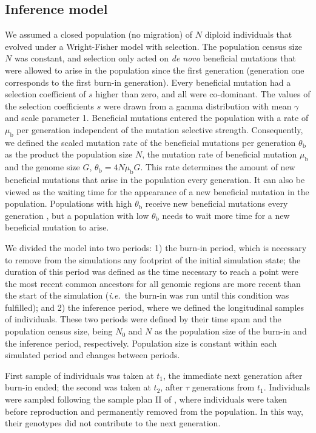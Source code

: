 \documentclass[a4paper, 12pt]{article}
\begin{document}
\subsection*{Inference model}

We assumed a closed population (no migration) of $N$ diploid individuals that evolved under a Wright-Fisher model with selection. The population census size $N$ was constant, and selection only acted on \textit{de novo} beneficial mutations that were allowed to arise in the population since the first generation (generation one corresponds to the first burn-in generation). Every beneficial mutation had a selection coefficient of $s$ higher than zero, and all were co-dominant. The values of the selection coefficients $s$ were drawn from a gamma distribution with mean $\gamma$ and scale parameter 1. Beneficial mutations entered the population with a rate of $\mu_\mathrm{b}$ per generation independent of the mutation selective strength. Consequently, we defined the scaled mutation rate of the beneficial mutations per generation $\theta_\mathrm{b}$ as the product the population size $N$, the mutation rate of beneficial mutation $\mu_\mathrm{b}$ and the genome size $G$, $\theta_\mathrm{b} = 4N\mu_\mathrm{b}G$. This rate determines the amount of new beneficial mutations that arise in the population every generation. It can also be viewed as the waiting time for the appearance of a new beneficial mutation in the population. Populations with high $\theta_\mathrm{b}$ receive new beneficial mutations every generation \citep{Karasov:2010di}, but a population with low $\theta_\mathrm{b}$ needs to wait more time for a new beneficial mutation to arise.

We divided the model into two periods: 1) the burn-in period, which is necessary to remove from the simulations any footprint of the initial simulation state; the duration of this period was defined as the time necessary to reach a point were the most recent common ancestors for all genomic regions are more recent than the start of the simulation (\textit{i.e.}\ the burn-in was run until this condition was fulfilled); and 2) the inference period, where we defined the longitudinal samples of individuals. These two periods were defined by their time spam and the population census size, being $N_\mathrm{0}$ and $N$ as the population size of the burn-in and the inference period, respectively. Population size is constant within each simulated period and changes between periods.

First sample of individuals was taken at $t_1$, the immediate next generation after burn-in ended; the second was taken at $t_2$, after $\tau$ generations from $t_1$. Individuals were sampled following the sample plan II of \citet{Nei:1981vb}, where individuals were taken before reproduction and permanently removed from the population. In this way, their genotypes did not contribute to the next generation.
\end{document}
